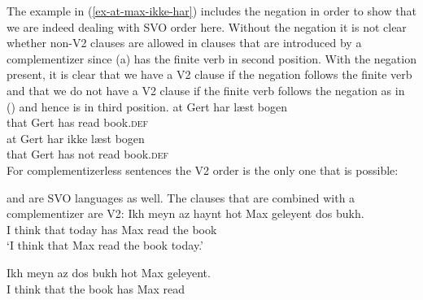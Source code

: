\eal
{}
\zl
The example in (\ref{ex-at-max-ikke-har}) includes the negation in order to show that we are indeed dealing
with SVO order here. Without the negation it is not clear whether non-V2 clauses are allowed in
clauses that are introduced by a complementizer since (a) has the finite verb in second
position. With the negation present, it is clear that we have a V2 clause if the negation follows
the finite verb and that we do not have a V2 clause if the finite verb follows the negation as in
() and hence is in third position.
\eal
\settowidth{}
\ex 
\gll at Gert har læst bogen\\
     that Gert has read book.\textsc{def}\\
\ex 
\gll at Gert har ikke læst bogen\\
     that Gert has not read book.\textsc{def}\\
\zl 
For complementizerless sentences the V2 order is the only one that is possible:
\eal
\settowidth{}
\zl 

\noindent
{} and  are SVO languages as well. The clauses that are combined with a
complementizer are V2:
\eal
\ex
\gll Ikh meyn  az   haynt hot Max geleyent dos bukh.\footnotemark\\
     I think that today has Max read the book\\\yiddish
{}
\glt `I think that Max read the book today.'

\ex%
\gll Ikh meyn  az   dos bukh hot Max geleyent.\\
     I think that the book has Max read\\

